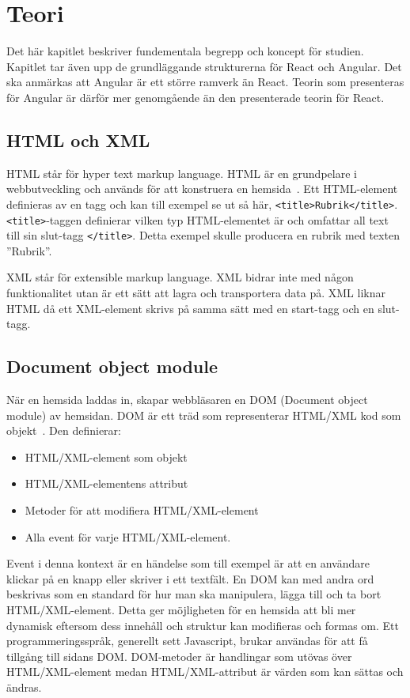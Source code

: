 \section{Teori}
\label{sec:axel-theory}
Det här kapitlet beskriver fundementala begrepp och koncept för studien. Kapitlet tar även upp de grundläggande strukturerna för React och Angular. Det ska anmärkas att Angular är ett större ramverk än React. Teorin som presenteras för Angular är därför mer genomgående än den presenterade teorin för React.

\subsection{HTML och XML}
HTML står för hyper text markup language. HTML är en grundpelare i webbutveckling och används för att konstruera en hemsida~\cite{w3-html}. Ett HTML-element definieras av en tagg och kan till exempel se ut så här, \texttt{<title>Rubrik</title>}. \texttt{<title>}-taggen definierar vilken typ HTML-elementet är och omfattar all text till sin slut-tagg \texttt{</title>}. Detta exempel skulle producera en rubrik med texten ''Rubrik''. 

XML står för extensible markup language. XML bidrar inte med någon funktionalitet utan är ett sätt att lagra och transportera data på. XML liknar HTML då ett XML-element skrivs på samma sätt med en start-tagg och en slut-tagg.

\subsection{Document object module}
När en hemsida laddas in, skapar webbläsaren en DOM (Document object module) av hemsidan. DOM är ett träd som representerar HTML/XML kod som objekt~\cite{w3-htmldom}. Den definierar:

\begin{itemize}
\item HTML/XML-element som objekt
\item HTML/XML-elementens attribut
\item Metoder för att modifiera HTML/XML-element
\item Alla event för varje HTML/XML-element.
\end{itemize} 

Event i denna kontext är en händelse som till exempel är att en användare klickar på en knapp eller skriver i ett textfält. En DOM kan med andra ord beskrivas som en standard för hur man ska manipulera, lägga till och ta bort HTML/XML-element. Detta ger möjligheten för en hemsida att bli mer dynamisk eftersom dess innehåll och struktur kan modifieras och formas om. Ett programmeringsspråk, generellt sett Javascript, brukar användas för att få tillgång till sidans DOM. DOM-metoder är handlingar som utövas över HTML/XML-element medan HTML/XML-attribut är värden som kan sättas och ändras.

